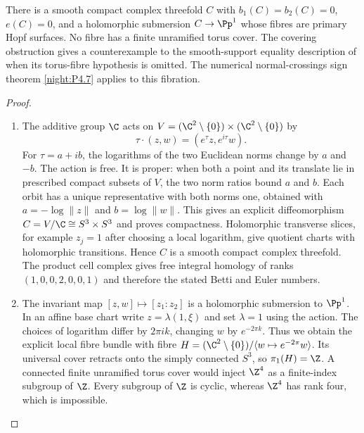\begin{proposition}\hypertarget{tag-02WI}{}\label{night:P4.11}\label{stmt:P4.11}

There is a smooth compact complex threefold $C$ with
$b_1(C)=b_2(C)=0$, $e(C)=0$, and a holomorphic submersion
$C\to\Pp^1$ whose fibres are primary Hopf surfaces. No fibre has
a finite unramified torus cover. The covering obstruction gives a counterexample to the smooth-support equality description of  when its torus-fibre hypothesis is omitted. The numerical normal-crossings sign theorem \ref{night:P4.7} applies to this fibration.
\end{proposition}
\begin{proof}

\begin{enumerate}[label=\arabic*.,leftmargin=*]
\item The additive group $\C$ acts on
$V=(\C^2\setminus\{0\})\times(\C^2\setminus\{0\})$ by
\[
 \tau\cdot(z,w)=(e^\tau z,e^{i\tau}w).
\]
For $\tau=a+ib$, the logarithms of the two Euclidean norms change
by $a$ and $-b$. The action is free. It is proper: when both a
point and its translate lie in prescribed compact subsets of $V$,
the two norm ratios bound $a$ and $b$. Each orbit has a unique
representative with both norms one, obtained with
$a=-\log\|z\|$ and $b=\log\|w\|$. This gives an explicit
diffeomorphism $C=V/\C\cong S^3\times S^3$ and proves compactness.
Holomorphic transverse slices, for example $z_j=1$ after choosing
a local logarithm, give quotient charts with holomorphic
transitions. Hence $C$ is a smooth compact complex threefold.
The product cell complex gives free integral homology of ranks
$(1,0,0,2,0,0,1)$ and therefore the stated Betti and Euler numbers.

\item The invariant map $[z,w]\mapsto[z_1:z_2]$ is a holomorphic
submersion to $\Pp^1$. In an affine base chart write
$z=\lambda(1,\xi)$ and set $\lambda=1$ using the action.
The choices of logarithm differ by $2\pi ik$, changing $w$ by
$e^{-2\pi k}$. Thus we obtain the explicit local fibre bundle
with fibre
$H=(\C^2\setminus\{0\})/\langle w\mapsto e^{-2\pi}w\rangle$.
Its universal cover retracts onto the simply connected $S^3$, so
$\pi_1(H)=\Z$. A connected finite unramified torus cover would
inject $\Z^4$ as a finite-index subgroup of $\Z$. Every subgroup
of $\Z$ is cyclic, whereas $\Z^4$ has rank four, which is
impossible.

\end{enumerate}
\end{proof}